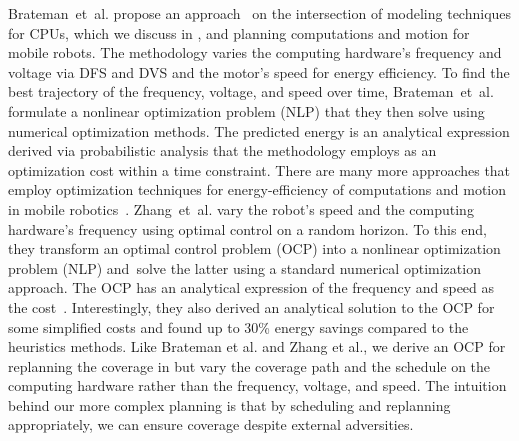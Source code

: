 Brateman~et~al. propose an approach~\citep{brateman2006energy} on the intersection of modeling techniques for CPUs, which we discuss in , and planning computations and motion for mobile robots. The methodology varies the computing hardware's frequency and voltage via DFS and DVS and the motor's speed for energy efficiency. To find the best trajectory of the frequency, voltage, and speed over time, Brateman~et~al. formulate a nonlinear optimization problem (NLP) that they then solve using numerical optimization methods. The predicted energy is an analytical expression derived via probabilistic analysis that the methodology employs as an optimization cost within a time constraint. There are many more approaches that employ optimization techniques for energy-efficiency of computations and motion in mobile robotics~\citep{zhang2007low,ondruska2015scheduled,lahijanian2018resource}. Zhang~et~al. vary the robot's speed and the computing hardware's frequency using optimal control on a random horizon. To this end, they transform an optimal control problem (OCP) into a nonlinear optimization problem (NLP) and solve the latter using a standard numerical optimization approach. The OCP has an analytical expression of the frequency and speed as the cost~\citep{zhang2007low}. Interestingly, they also derived an analytical solution to the OCP for some simplified costs and found up to 30\% energy savings compared to the heuristics methods. Like Brateman et al. and Zhang et al., we derive an OCP for replanning the coverage in  but vary the coverage path and the schedule on the computing hardware rather than the frequency, voltage, and speed. The intuition behind our more complex planning is that by scheduling and replanning appropriately, we can ensure coverage despite external adversities.

